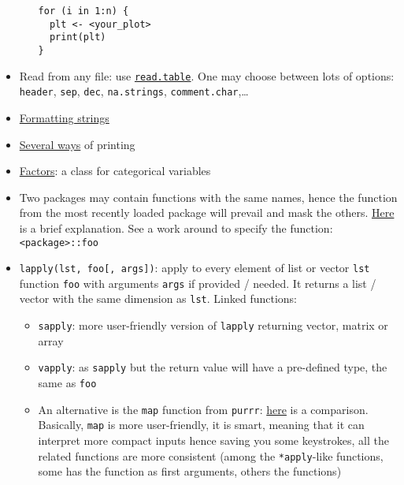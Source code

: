 \documentclass[a4paper,12pt,%
              final%
              ]{article}
\begin{document}
\begin{itemize}
\begin{itemize}
\begin{verbatim}
for (i in 1:n) {
  plt <- <your_plot>
  print(plt)
}
\end{verbatim}
    \end{itemize}
  \item Read from any file: use \href{https://stat.ethz.ch/R-manual/R-devel/library/utils/html/read.table.html}{\texttt{read.table}}. One may choose between lots of options: \texttt{header}, \texttt{sep}, \texttt{dec}, \texttt{na.strings}, \texttt{comment.char},\ldots
  \item \href{https://stackoverflow.com/questions/46085274/is-there-a-string-formatting-operator-in-r-similar-to-pythons}{Formatting strings}
  \item \href{https://www.geeksforgeeks.org/printing-output-of-an-r-program/}{Several ways} of printing
  \item \href{https://www.datamentor.io/r-programming/factor/}{Factors}: a class for categorical variables
  \item Two packages may contain functions with the same names, hence the function from the most recently loaded package will prevail and mask the others. \href{https://stackoverflow.com/questions/39137110/what-does-the-following-object-is-masked-from-packagexxx-mean}{Here} is a brief explanation. See a work around to specify the function: \verb|<package>::foo|
  \item \verb|lapply(lst, foo[, args])|: apply to every element of list or vector \verb|lst| function \verb|foo| with arguments \verb|args| if provided / needed. It returns a list / vector with the same dimension as \verb|lst|. Linked functions:
    \begin{itemize}
      \item \verb|sapply|: more user-friendly version of \verb|lapply| returning vector, matrix or array
      \item \verb|vapply|: as \verb|sapply| but the return value will have a pre-defined type, the same as \verb|foo|
      \item An alternative is the \verb|map| function from \texttt{purrr}: \href{https://stackoverflow.com/questions/45101045/why-use-purrrmap-instead-of-lapply}{here} is a comparison. Basically, \verb|map| is more user-friendly, it is smart, meaning that it can interpret more compact inputs hence saving you some keystrokes, all the related functions are more consistent (among the \verb|*apply|-like functions, some has the function as first arguments, others the functions)
    \end{itemize}
\end{itemize}
\end{document}
